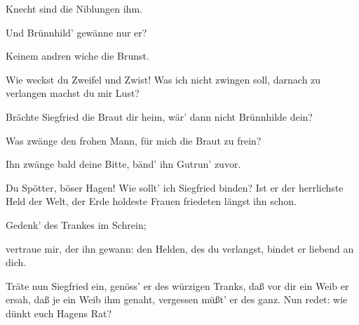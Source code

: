 \begin{drama}
\Hagenspeaks

Knecht sind die Niblungen ihm.
 

\Guntherspeaks

Und Brünnhild' gewänne nur er?
 

\Hagenspeaks

Keinem andren wiche die Brunst.
 

\Guntherspeaks



Wie weckst du Zweifel und Zwist!
Was ich nicht zwingen soll,
darnach zu verlangen machst du mir Lust?
 




\Hagenspeaks

Brächte Siegfried die Braut dir heim,
wär' dann nicht Brünnhilde dein?
 

\Guntherspeaks



Was zwänge den frohen Mann,
für mich die Braut zu frein?
 

\Hagenspeaks



Ihn zwänge bald deine Bitte,
bänd' ihn Gutrun' zuvor.
 

\Gutrunespeaks

Du Spötter, böser Hagen!
Wie sollt' ich Siegfried binden?
Ist er der herrlichste Held der Welt,
der Erde holdeste Frauen
friedeten längst ihn schon.
 

\Hagenspeaks



Gedenk' des Trankes im Schrein;


vertraue mir, der ihn gewann:
den Helden, des du verlangst,
bindet er liebend an dich.


Träte nun Siegfried ein,
genöss' er des würzigen Tranks,
daß vor dir ein Weib er ersah,
daß je ein Weib ihm genaht,
vergessen müßt' er des ganz.
Nun redet: wie dünkt euch Hagens Rat?
 

\Guntherspeaks



\end{drama}
